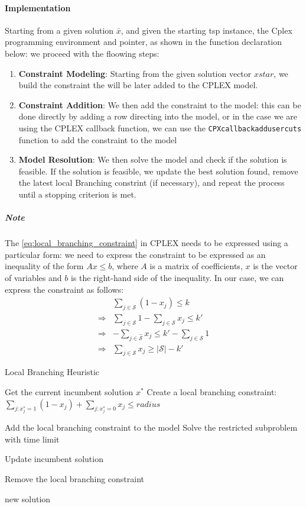 \documentclass{article}
\begin{document}
\paragraph{Implementation}
Starting from a given solution $\bar{x}$, and given the starting tsp instance, the Cplex programming environment and pointer, as shown in the function declaration below:
we proceed with the floowing steps:
\begin{enumerate}
	\item \textbf{Constraint Modeling}: Starting from the given solution vector $xstar$, we build the constraint the will be later added to the CPLEX model.
	\item \textbf{Constraint Addition}: We then add the constraint to the model: this can be done directly by adding a row directing into the model, 
	or in the case we are using the CPLEX callback function, we can use the \texttt{CPXcallbackaddusercuts} function to add the constraint to the model

	\item \textbf{Model Resolution}: We then solve the model and check if the solution is feasible. If the solution is feasible, we update the best solution found, 
	remove the latest local Branching constrint (if necessary), and repeat the process until a stopping criterion is met.
\end{enumerate}

\subparagraph{Note}
The \ref{eq:local_branching_constraint} in CPLEX needs to be expressed using a particular form: we need to express the constraint
to be expressed as an inequality of the form $Ax \leq b$, where $A$ is a matrix of coefficients, $x$ is the vector of variables and $b$ is the right-hand side of the inequality.
In our case, we can express the constraint as follows:
\begin{align}
	& \sum_{j \in \mathcal{S}} (1 - x_j) \leq k \\
	\Rightarrow & \sum_{j \in \mathcal{S}}1 -\sum_{j \in \mathcal{S}} x_j \leq k' \\
	\Rightarrow & -\sum_{j \in \hat{\mathcal{S}}} x_j \leq k' - \sum_{j \in \mathcal{S}}1 \\
	\Rightarrow & \sum_{j \in \mathcal{S}} x_j \geq |\mathcal{S}| - k'
\end{align}

\begin{algorithm}[!ht]
	\caption{Local Branching Heuristic}
	\begin{algorithmic}[1]
	\State Get the current incumbent solution $x^*$
	\State Create a local branching constraint: $\sum_{j: x^*_j = 1} (1 - x_j) + \sum_{j: x^*_j = 0} x_j \leq radius$
	
	\State Add the local branching constraint to the model
	\State Solve the restricted subproblem with time limit
	
		\State Update incumbent solution
	\EndIf
	
	\State Remove the local branching constraint
	
	\State \Return new solution
	\EndProcedure
	\end{algorithmic}
	\end{algorithm}
\newpage
\end{document}
